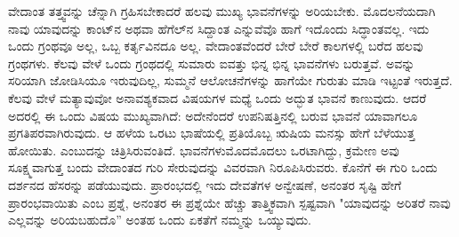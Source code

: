 ವೇದಾಂತ ತತ್ತ್ವವನ್ನು ಚೆನ್ನಾಗಿ ಗ್ರಹಿಸಬೇಕಾದರೆ ಹಲವು ಮುಖ್ಯ ಭಾವನೆಗಳನ್ನು ಅರಿಯಬೇಕು. ಮೊದಲನೆಯದಾಗಿ ನಾವು ಯಾವುದನ್ನು ಕಾಂಟ್‌ನ ಅಥವಾ ಹೆಗೆಲ್‌ನ ಸಿದ್ದಾಂತ ಎನ್ನುವೆವೊ ಹಾಗೆ ಇದೊಂದು ಸಿದ್ಧಾಂತವಲ್ಲ. ಇದು ಒಂದು ಗ್ರಂಥವೂ ಅಲ್ಲ, ಒಬ್ಬ ಕರ್ತೃವಿನದೂ ಅಲ್ಲ. ವೇದಾಂತವೆಂದರೆ ಬೇರೆ ಬೇರೆ ಕಾಲಗಳಲ್ಲಿ ಬರೆದ ಹಲವು ಗ್ರಂಥಗಳು. ಕೆಲವು ವೇಳೆ ಒಂದು ಗ್ರಂಥದಲ್ಲಿ ಸುಮಾರು ಐವತ್ತು ಭಿನ್ನ ಭಿನ್ನ ಭಾವನೆಗಳು ಬರುತ್ತವೆ. ಅವನ್ನು ಸರಿಯಾಗಿ ಜೋಡಿಸಿಯೂ ಇರುವುದಿಲ್ಲ, ಸುಮ್ಮನೆ ಆಲೋಚನೆಗಳನ್ನು ಹಾಗೆಯೇ ಗುರುತು ಮಾಡಿ ಇಟ್ಟಂತೆ ಇರುತ್ತದೆ. ಕೆಲವು ವೇಳೆ ಮತ್ಯಾವುವೋ ಅನಾವಶ್ಯಕವಾದ ವಿಷಯಗಳ ಮಧ್ಯೆ ಒಂದು ಅದ್ಭುತ ಭಾವನೆ ಕಾಣುವುದು. ಆದರೆ ಅದರಲ್ಲಿ ಈ ಒಂದು ವಿಷಯ ಮುಖ್ಯವಾಗಿದೆ: ಅದೇನೆಂದರೆ ಉಪನಿಷತ್ತಿನಲ್ಲಿ ಬರುವ ಭಾವನೆ ಯಾವಾಗಲೂ ಪ್ರಗತಿಪರವಾಗಿರುವುದು. ಆ ಹಳೆಯ ಒರಟು ಭಾಷೆಯಲ್ಲಿ ಪ್ರತಿಯೊಬ್ಬ ಋಷಿಯ ಮನಸ್ಸು ಹೇಗೆ ಬೆಳೆಯುತ್ತ ಹೋಯಿತು. ಎಂಬುದನ್ನು ಚಿತ್ರಿಸಿರುವಂತಿದೆ. ಭಾವನೆಗಳು\break ಮೊದಮೊದಲು ಒರಟಾಗಿದ್ದು, ಕ್ರಮೇಣ ಅವು ಸೂಕ್ಷ್ಮವಾಗುತ್ತ ಬಂದು ವೇದಾಂತದ ಗುರಿ ಸೇರುವುದನ್ನು ವಿವರವಾಗಿ ನಿರೂಪಿಸಿರುವರು. ಕೊನೆಗೆ ಈ ಗುರಿ ಒಂದು ದರ್ಶನದ ಹೆಸರನ್ನು ಪಡೆಯುವುದು. ಪ್ರಾರಂಭದಲ್ಲಿ ಇದು ದೇವತೆಗಳ ಅನ್ವೇಷಣೆ, ಅನಂತರ ಸೃಷ್ಟಿ ಹೇಗೆ ಪ್ರಾರಂಭವಾಯಿತು ಎಂಬ ಪ್ರಶ್ನೆ, ಅನಂತರ ಈ ಪ್ರಶ್ನೆಯೇ ಹೆಚ್ಚು ತಾತ್ತ್ವಿಕವಾಗಿ ಸ್ಪಷ್ಟವಾಗಿ "ಯಾವುದನ್ನು ಅರಿತರೆ ನಾವು ಎಲ್ಲವನ್ನು ಅರಿಯಬಹುದೊ” ಅಂತಹ ಒಂದು ಏಕತೆಗೆ ನಮ್ಮನ್ನು ಒಯ್ಯುವುದು.

